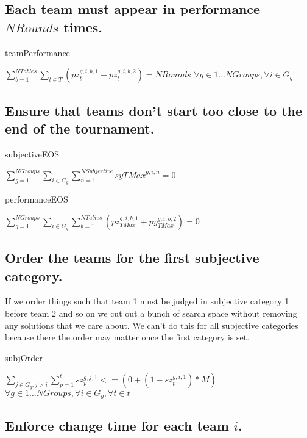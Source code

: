 \documentclass[letterpaper,11pt]{report}
\begin{document}
\FloatBarrier
\subsection{Each team must appear in performance $NRounds$ times.}

\begin{algorithm}
\caption{teamPerformance}
$\sum\limits_{b=1}^{NTables} \sum\limits_{t \in T} ( pz_{t}^{g,i,b,1} + pz_{t}^{g,i,b,2} ) = NRounds$
\hfill $
\forall g \in 1 \dots NGroups,
\forall i \in G_{g}
$
\end{algorithm}

\FloatBarrier
\subsection{Ensure that teams don't start too close to the end of the
  tournament.}
\begin{algorithm}
\caption{subjectiveEOS}
$
\sum\limits_{g=1}^{NGroups}
\sum\limits_{i \in G_{g}}
  \sum\limits_{n=1}^{NSubjective} sy{TMax}^{g,i,n} = 0$
\end{algorithm}

\begin{algorithm}
\caption{performanceEOS}
$
\sum\limits_{g=1}^{NGroups}
\sum\limits_{i \in G_{g}}
  \sum\limits_{b=1}^{NTables}
  ( pz_{TMax}^{g,i,b,1} + py_{TMax}^{g,i,b,2} ) = 0$
\end{algorithm}

\FloatBarrier
\subsection{Order the teams for the first subjective category.}
If we order things such that team 1 must be judged in subjective category 1
before team 2 and so on we cut out a bunch of search space without removing
any solutions that we care about. We can't do this for all subjective
categories because there the order may matter once the first category is
set.
\begin{algorithm}
\caption{subjOrder}
$
\sum\limits_{j \in G_{g} \colon j > i}
  \sum\limits_{p=1}^{t} sz_{p}^{g,j,1} <= 
( 0 + ( 1 - sz_{t}^{g,i,1} ) * M )$
\hfill $
\forall g \in 1 \dots NGroups,
\forall i \in G_{g}, 
\forall t \in t
$
\end{algorithm}

\FloatBarrier
\subsection{Enforce change time for each team $i$.}
\end{document}
